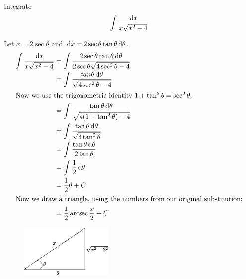 \begin{ex}
  Integrate
  \[ \int \frac{\,\mathrm{d} x}{x \sqrt {x^2 -4}} \]
  \begin{sol}
    Let $x=2 \sec \theta$ and $\,\mathrm{d} x = 2 \sec \theta \tan \theta \,\mathrm{d} \theta$.
    \begin{align*}
      \int \frac{\,\mathrm{d} x}{x \sqrt {x^2 -4}}
      &= \int \frac{2 \sec \theta \tan \theta \,\mathrm{d} \theta}{2 \sec \theta \sqrt{4\sec^2 \theta -4}} \\
      &= \int\frac{tan \theta \,\mathrm{d} \theta}{\sqrt{4 \sec^2 \theta -4}} \\
      \intertext{Now we use the trigonometric identity $1+\tan^2\theta=\sec^2\theta$.}
      &= \int \frac{\tan\theta\,\mathrm{d}\theta}{\sqrt{4(1+\tan^2\theta)-4}}\\
      &= \int \frac{\tan\theta\,\mathrm{d}\theta}{\sqrt{4\tan^2\theta}}\\
      &= \int\frac{\tan\theta\,\mathrm{d}\theta}{2\tan\theta}\\
      &= \int \frac{1}{2}\,\mathrm{d}\theta \\
      &= \frac{1}{2}\theta+C\\
      \intertext{Now we draw a triangle, using the numbers from our original substitution:}
      &=\frac{1}{2}\operatorname{arcsec}{\frac{x}{2}} +C
    \end{align*}
    \begin{figure}[H]
      \begin{center}
        \includegraphics[width=0.4\textwidth]{continuous/integration/secexample}
      \end{center}
    \end{figure}
  \end{sol}
\end{ex}
